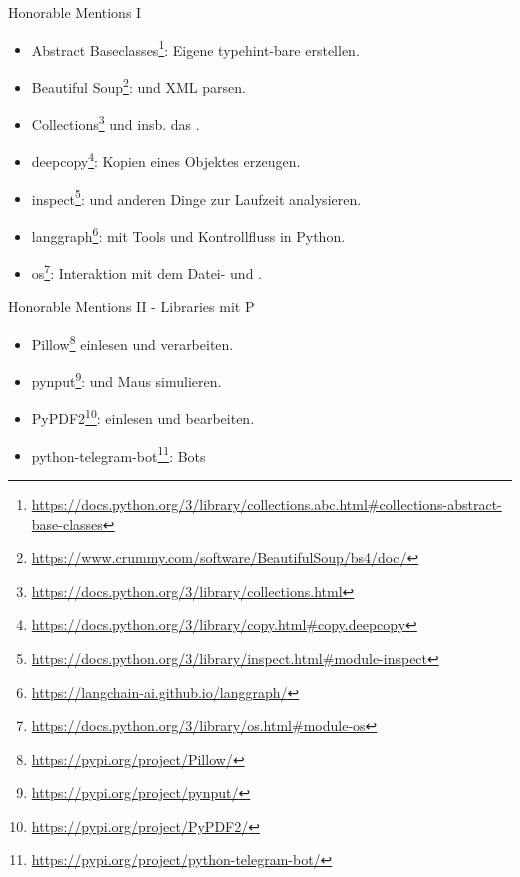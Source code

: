 \documentclass[12pt, aspectratio=169, usepdftitle=false, handout]{beamer}
\newcommand{\furl}[1]{\footnote{\url{#1}}}
\begin{document}
\begin{frame}[fragile]{Honorable Mentions I}
	\begin{itemize}
		\item Abstract Baseclasses\furl{https://docs.python.org/3/library/collections.abc.html\#collections-abstract-base-classes}: Eigene typehint-bare  erstellen.
		
		\item Beautiful Soup\furl{https://www.crummy.com/software/BeautifulSoup/bs4/doc/}:  und XML parsen.
		
		\item Collections\furl{https://docs.python.org/3/library/collections.html} und insb. das .
		
		\item deepcopy\furl{https://docs.python.org/3/library/copy.html\#copy.deepcopy}:  Kopien eines Objektes erzeugen.
		
		\item inspect\furl{https://docs.python.org/3/library/inspect.html\#module-inspect}:  und anderen Dinge zur Laufzeit analysieren.
		
		\item langgraph\furl{https://langchain-ai.github.io/langgraph/}:  mit Tools und Kontrollfluss in Python.

		\item os\furl{https://docs.python.org/3/library/os.html\#module-os}: Interaktion mit dem Datei- und .
		
	\end{itemize}
\end{frame}


\begin{frame}[fragile]{Honorable Mentions II - Libraries mit P}
	\begin{itemize}

		
		\item Pillow\furl{https://pypi.org/project/Pillow/}  einlesen und verarbeiten.
		
		\item pynput\furl{https://pypi.org/project/pynput/}:  und Maus simulieren.
		
		\item PyPDF2\furl{https://pypi.org/project/PyPDF2/}:  einlesen und bearbeiten.
		
		\item python-telegram-bot\furl{https://pypi.org/project/python-telegram-bot/}:  Bots
		
	\end{itemize}
\end{frame}
\end{document}
